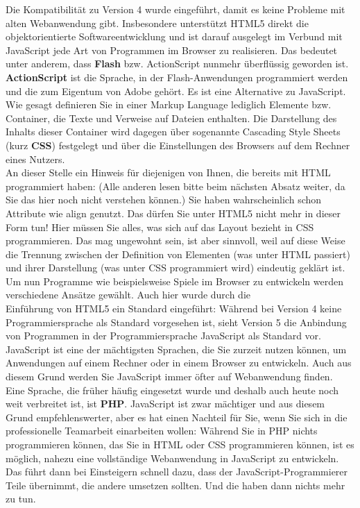 Die Kompatibilität zu Version 4 wurde eingeführt, damit es keine Probleme mit alten Webanwendung gibt. Insbesondere unterstützt HTML5 direkt die objektorientierte Softwareentwicklung und ist darauf ausgelegt im Verbund mit JavaScript jede Art von Programmen im Browser zu realisieren. Das bedeutet unter anderem, dass \textbf{Flash} bzw. ActionScript nunmehr überflüssig geworden ist. \textbf{ActionScript} ist die Sprache, in der Flash-Anwendungen programmiert werden und die zum Eigentum von Adobe gehört. Es ist eine Alternative zu JavaScript.\\

Wie gesagt definieren Sie in einer Markup Language lediglich Elemente bzw. Container, die Texte und Verweise auf Dateien enthalten. Die Darstellung des Inhalts dieser Container wird dagegen über sogenannte Cascading Style Sheets (kurz \textbf{CSS}) festgelegt und über die Einstellungen des Browsers auf dem Rechner eines Nutzers.\\

An dieser Stelle ein Hinweis für diejenigen von Ihnen, die bereits mit HTML programmiert haben: (Alle anderen lesen bitte beim nächsten Absatz weiter, da Sie das hier noch nicht verstehen können.) Sie haben wahrscheinlich schon Attribute wie align genutzt. Das dürfen Sie unter HTML5 nicht mehr in dieser Form tun! Hier müssen Sie alles, was sich auf das Layout bezieht in CSS programmieren. Das mag ungewohnt sein, ist aber sinnvoll, weil auf diese Weise die Trennung zwischen der Definition von Elementen (was unter HTML passiert) und ihrer Darstellung (was unter CSS programmiert wird) eindeutig geklärt ist.\\

Um nun Programme wie beispielsweise Spiele im Browser zu entwickeln werden verschiedene Ansätze gewählt. Auch hier wurde durch die\\ Einführung von HTML5 ein Standard eingeführt: Während bei Version 4 keine Programmiersprache als Standard vorgesehen ist, sieht Version 5 die Anbindung von Programmen in der Programmiersprache JavaScript als Standard vor. JavaScript ist eine der mächtigsten Sprachen, die Sie zurzeit nutzen können, um Anwendungen auf einem Rechner oder in einem Browser zu entwickeln. Auch aus diesem Grund werden Sie JavaScript immer öfter auf Webanwendung finden. \\

Eine Sprache, die früher häufig eingesetzt wurde und deshalb auch heute noch weit verbreitet ist, ist \textbf{PHP}. JavaScript ist zwar mächtiger und aus diesem Grund empfehlenswerter, aber es hat einen Nachteil für Sie, wenn Sie sich in die professionelle Teamarbeit einarbeiten wollen: Während Sie in PHP nichts programmieren können, das Sie in HTML oder CSS programmieren können, ist es möglich, nahezu eine vollständige Webanwendung in JavaScript zu entwickeln. Das führt dann bei Einsteigern schnell dazu, dass der JavaScript-Programmierer Teile übernimmt, die andere umsetzen sollten. Und die haben dann nichts mehr zu tun.\\

